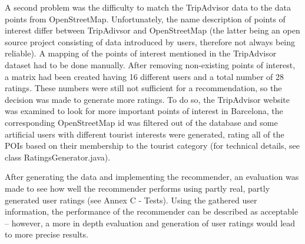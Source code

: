 A second problem was the difficulty to match the TripAdvisor data to the data points from OpenStreetMap. Unfortunately, the name description of points of interest differ between TripAdivsor and OpenStreetMap (the latter being an open source project consisting of data introduced by users, therefore not always being reliable). A mapping of the points of interest mentioned in the TripAdvisor dataset had to be done manually. After removing non-existing points of interest, a matrix had been created having 16 different users and a total number of 28 ratings. These numbers were still not sufficient for a recommendation, so the decision was made to generate more ratings.  To do so, the TripAdvisor website was examined to look for more important points of interest in Barcelona, the corresponding OpenStreetMap id was filtered out of the database and some artificial users with different tourist interests were generated, rating all of the POIs based on their membership to the tourist category (for technical details, see class RatingsGenerator.java).

After generating the data and implementing the recommender, an evaluation was made to see how well the recommender performs using partly real, partly generated user ratings (see Annex C - Tests). Using the gathered user information, the performance of the recommender can be described as acceptable – however, a more in depth evaluation and generation of user ratings would lead to more precise results.

